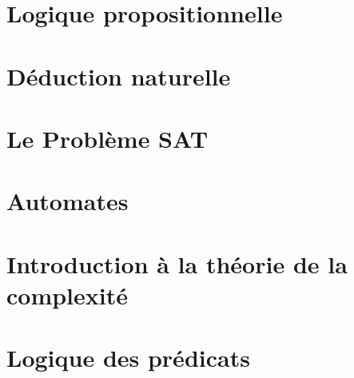 \documentclass[a4paper, 12pt]{extarticle}
\begin{document}


\makemargins %
\makefrontpage
\maketoc


% 



\section{Logique propositionnelle}
\label{sec:logique_propositionnelle}

\newpage


\section{Déduction naturelle}
\label{sec:déduction_naturelle}

\newpage


\section{Le Problème SAT}
\label{sec:sat}

\newpage

\section{Automates}
\label{sec:automates}

\newpage

\section{Introduction à la théorie de la complexité}
\label{sec:complexité}

\newpage

\section{Logique des prédicats}
\label{sec:logique_prédicats}

\newpage

\end{document}
